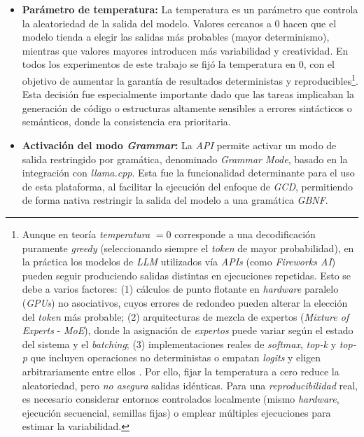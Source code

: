 \begin{itemize}
    \item \textbf{Parámetro de temperatura:} La temperatura es un parámetro que controla la aleatoriedad de la salida del modelo. Valores cercanos a 0 hacen que el modelo tienda a elegir las salidas más probables (mayor determinismo), mientras que valores mayores introducen más variabilidad y creatividad. En todos los experimentos de este trabajo se fijó la temperatura en 0, con el objetivo de aumentar la garantía de resultados deterministas y reproducibles\footnote{Aunque en teoría \emph{temperatura} $= 0$ corresponde a una decodificación puramente \emph{greedy} (seleccionando siempre el \emph{token} de mayor probabilidad), en la práctica los modelos de \emph{LLM} utilizados vía \emph{APIs} (como \emph{Fireworks AI}) pueden seguir produciendo salidas distintas en ejecuciones repetidas. Esto se debe a varios factores: (1) cálculos de punto flotante en \emph{hardware} paralelo (\emph{GPUs}) no asociativos, cuyos errores de redondeo pueden alterar la elección del \emph{token} más probable; (2) arquitecturas de mezcla de expertos (\emph{Mixture of Experts} - \emph{MoE}), donde la asignación de \emph{expertos} puede variar según el estado del sistema y el \emph{batching}; (3) implementaciones reales de \emph{softmax}, \emph{top-k} y \emph{top-p} que incluyen operaciones no deterministas o empatan \emph{logits} y eligen arbitrariamente entre ellos \parencite{weinmeister2024zero, pamelatoman2023nondeterminism}. Por ello, fijar la temperatura a cero reduce la aleatoriedad, pero \emph{no asegura} salidas idénticas. Para una \emph{reproducibilidad} real, es necesario considerar entornos controlados localmente (mismo \emph{hardware}, ejecución secuencial, semillas fijas) o emplear múltiples ejecuciones para estimar la variabilidad.}. Esta decisión fue especialmente importante dado que las tareas implicaban la generación de código o estructuras altamente sensibles a errores sintácticos o semánticos, donde la consistencia era prioritaria.


    \item \textbf{Activación del modo \textit{Grammar}:} La \textit{API} permite activar un modo de salida restringido por gramática, denominado \textit{Grammar Mode}, basado en la integración con \textit{llama.cpp}. Esta fue la funcionalidad determinante para el uso de esta plataforma, al facilitar la ejecución del enfoque de \textit{GCD}, permitiendo de forma nativa restringir la salida del modelo a una gramática \textit{GBNF}.

\end{itemize}

